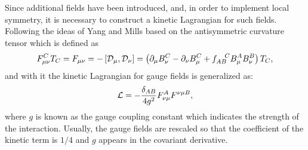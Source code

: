 Since additional fields have been introduced, and, in order to implement local symmetry, it is necessary to construct a kinetic Lagrangian for such fields. Following the ideas of Yang and Mills based on the antisymmetric curvature tensor which is defined as
\begin{equation}
	F_{\mu\nu}^CT_C
		=F_{\mu\nu}
		=-\cor{\Dcov_\mu,\Dcov_\nu}
		=\fac{
			\partial_\mu B^C_\nu-\partial_\nu B^C_\mu+f_{AB}^{\;\;\;\;C}B^A_\mu B^B_\nu
		}T_C,
\end{equation}
and with it the kinetic Lagrangian for gauge fields is generalized as:
$$
\mathcal{L}=-\frac{\delta_{AB}}{4 g^2} F^A_{\nu\mu}F^{\nu\mu B},
$$
where $g$ is known as the gauge coupling constant which indicates the strength of the interaction. Usually, the gauge fields are rescaled so that the coefficient of the kinetic term is $1 / 4$ and $g$ appears in the covariant derivative.

